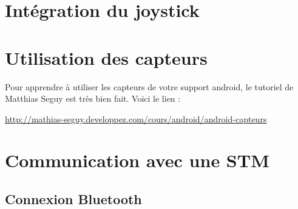 \documentclass[a4paper,10pt]{article}
\begin{document}

\section{Intégration du joystick}


\section{Utilisation des capteurs}
Pour apprendre à utiliser les capteurs de votre support android, le tutoriel de Matthias Seguy est très bien fait. 
Voici le lien : 

\url{http://mathias-seguy.developpez.com/cours/android/android-capteurs}

\section{Communication avec une STM}

\subsection{Connexion Bluetooth}
\end{document}
